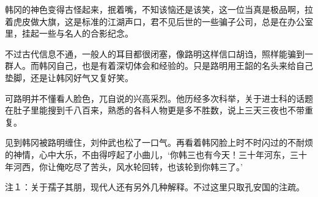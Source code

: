 韩冈的神色变得古怪起来，抿着嘴，不知该恼还是该笑，这一位当真是极品啊，拉着虎皮做大旗，这是标准的江湖声口，君不见后世的一些骗子公司，总是在办公室里，挂起一些与名人的合影纪念。

不过古代信息不通，一般人的耳目都很闭塞，像路明这样信口胡诌，照样能骗到一群人。而韩冈自己，也是有着深切体会和经验的。只是路明用王韶的名头来给自己垫脚，还是让韩冈好气又复好笑。

可路明并不懂看人脸色，兀自说的兴高采烈。他历经多次科举，关于进士科的话题在肚子里能搜到千八百来，熟悉的各科人物更是多不胜数，说上三天三夜也不带重复。

见到韩冈被路明缠住，刘仲武也松了一口气。再看着韩冈脸上时不时闪过的不耐烦的神情，心中大乐，不由得哼起了小曲儿，‘你韩三也有今天！三十年河东，三十年河西，你让俺吃尽了苦头，风水轮回转，也该轮到你韩三了。’

注１：关于孺子其朋，现代人还有另外几种解释。不过这里只取孔安国的注疏。

